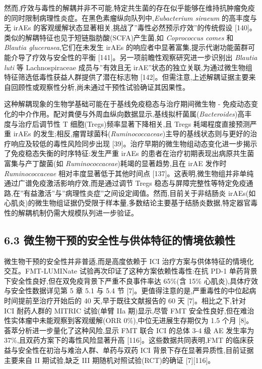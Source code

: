 然而,疗效与毒性的解耦并非不可能,特定共生菌的存在似乎能够在维持抗肿瘤免疫的同时限制病理性炎症。在黑色素瘤纵向队列中,\emph{Eubacterium siraeum} 的高丰度与无 irAEs 的客观缓解状态显著相关,挑战了''毒性必然预示疗效''的传统假设 {[}140{]}。类似的解耦特征也见于短链脂肪酸(SCFA)产生菌,如 \emph{Coprococcus comes} 和 \emph{Blautia glucerasea},它们在未发生 irAEs 的响应者中显著富集,提示代谢功能菌群可能介导了疗效与安全性的平衡 {[}141{]}。另一项前瞻性观察研究进一步识别出 \emph{Blautia luti} 等 Lachnospiraceae 成员与''有效且无 irAE''状态的独立关联,为通过微生物组特征筛选低毒性获益人群提供了潜在标志物 {[}142{]}。但需注意,上述解耦证据主要来自回顾性或观察性分析,尚未通过干预性试验确证其因果性。

这种解耦现象的生物学基础可能在于基线免疫稳态与治疗期间微生物 - 免疫动态变化的中介作用。配对粪便与外周血纵向数据显示,基线拟杆菌属(\emph{Bacteroides})高丰度与治疗后调节性 T 细胞(Tregs)频率显著下降相关,且 Tregs 耗竭程度直接预测严重 irAEs 的发生;相反,瘤胃球菌科(\emph{Ruminococcaceae})主导的基线状态则与更好的治疗响应及较低的毒性风险同步出现 {[}39{]}。治疗早期的微生物组动态变化进一步揭示了免疫稳态失衡的时序特征:发生严重 irAEs 的患者在治疗初期表现出病原共生菌富集与产丁酸菌(如 \emph{Ruminococcaceae})耗竭的显著趋势,且在 irAE 发作时 \emph{Ruminococcaceae} 相对丰度显著低于其他时间点 {[}137{]}。这表明,微生物组并非单纯通过广谱免疫激活影响疗效,而是通过调节 Tregs 稳态与屏障完整性等特定免疫通路,在''有益激活''与''病理性炎症''之间设定阈值。然而,目前关于非结肠炎 irAEs(如心肌炎)的微生物组证据仍受限于样本量,多数结论主要基于结肠炎数据,特定器官毒性的解耦机制仍需大规模队列进一步验证。

\subsection{6.3 微生物干预的安全性与供体特征的情境依赖性}\label{ux5faeux751fux7269ux5e72ux9884ux7684ux5b89ux5168ux6027ux4e0eux4f9bux4f53ux7279ux5f81ux7684ux60c5ux5883ux4f9dux8d56ux6027}

微生物干预的安全性并非普适,而是高度依赖于 ICI 治疗方案与供体特征的情境化交互。FMT-LUMINate 试验再次印证了这种方案依赖性毒性:在抗 PD-1 单药背景下安全性良好,但在双免疫背景下严重不良事件率达 65\%(含 15\% 心肌炎),具体疗效与安全性数据详见第 5 章 5.1 与 5.4 节 {[}7{]}。更值得注意的是,严重毒性的中位起病时间提前至治疗开始后的 40 天,早于既往文献报告的 60 天 {[}7{]}。相比之下,针对 ICI 耐药人群的 MITRIC 试验(单臂 IIa 期)显示,尽管 FMT 安全性良好,但在难治性实体瘤中未能观察到客观缓解(ORR 0\%),中位无进展生存期仅为 1.5 个月 {[}8{]}。荟萃分析进一步量化了这种风险,显示 FMT 联合 ICI 的总体 3-4 级 AE 发生率为 37\%,且双药方案下的毒性风险显著升高 {[}116{]}。这些数据共同表明,FMT 的临床获益与安全性在初治与难治人群、单药与双药 ICI 背景下存在显著异质性,目前证据主要来自 II 期试验,缺乏 III 期随机对照试验(RCT)的确证 {[}7{]}{[}116{]}。

